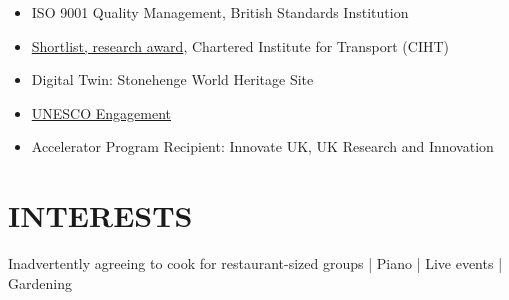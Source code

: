 \documentclass[a4paper,9pt]{extarticle}
\begin{document}
\begin{itemize}
    \item ISO 9001 Quality Management, British Standards Institution
    \item \href{https://www.ciht.org.uk/news/exciting-transport-projects-make-awards-shortlist/}{Shortlist, research award}, Chartered Institute for Transport (CIHT)
    \item Digital Twin: Stonehenge World Heritage Site
    \item \href{https://whc.unesco.org/en/documents/195526}{UNESCO Engagement}
    \item Accelerator Program Recipient: Innovate UK, UK Research and Innovation
\end{itemize}

\section*{INTERESTS}
\begin{center}
    Inadvertently agreeing to cook for restaurant-sized groups | Piano | Live events | Gardening
\end{center}

\end{document}
